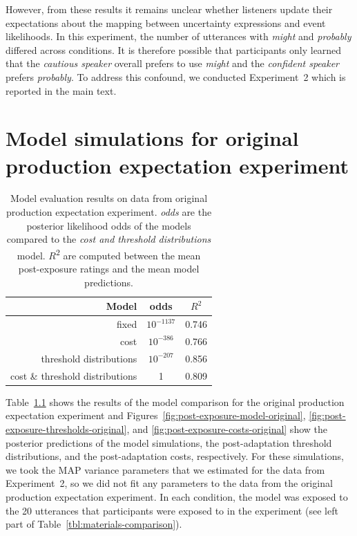 However, from these results it remains unclear whether listeners update their expectations about the mapping between uncertainty expressions and event likelihoods. In this experiment, the number of utterances with \textit{might} and \textit{probably} differed across conditions. It is therefore possible that participants only learned that the {\it cautious speaker} overall prefers to use {\it might} and the {\it confident speaker} prefers {\it probably}. To address this confound, we conducted Experiment~2 which is reported in the main text.

\chapter[Original adaptation experiment simulations]{Model simulations for original production expectation experiment}


\begin{table}
\center
\begin{tabular}{r | c | c }
Model &   odds  &  $R^2$ \\ \midrule
fixed & $10^{-1137}$ &  0.746       \\
cost & $10^{-386}$ & 0.766     \\
threshold distributions & $10^{-207}$ &  0.856 \\
cost \& threshold distributions & 1 &  0.809 \\
\end{tabular}
\caption{Model evaluation results on data from original production expectation experiment.   \textit{odds} are the posterior likelihood odds of the models compared to the \textit{cost and threshold distributions} model.  $R$\textsuperscript{$2$} are computed between  the mean post-exposure ratings and the mean model predictions. \label{tbl:model-comparison-orig}}
\end{table}


Table~\ref{tbl:model-comparison-orig} shows the results of the model comparison  for the original production expectation experiment and  Figures~\ref{fig:post-exposure-model-original}, \ref{fig:post-exposure-thresholds-original}, and \ref{fig:post-exposure-costs-original} show the posterior predictions
of the model simulations, the post-adaptation threshold distributions, and the post-adaptation costs, respectively. For these simulations, we took the MAP variance parameters that we estimated for the data from Experiment~2, so we did not fit any parameters to the data from the original production expectation experiment. In each condition, the model was exposed to the 20 utterances that participants were exposed to in the experiment (see left part of Table~\ref{tbl:materials-comparison}).

